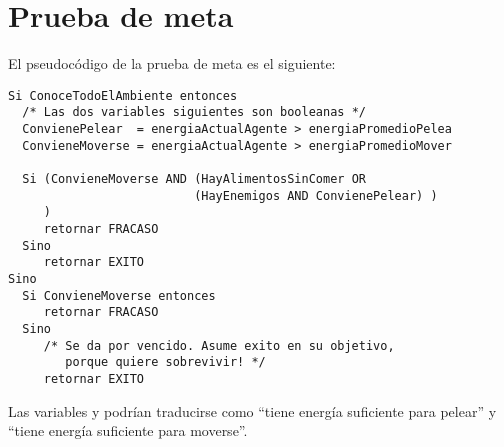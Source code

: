 \section{Prueba de meta}

El pseudocódigo de la prueba de meta es el siguiente:


\begin{verbatim}
Si ConoceTodoElAmbiente entonces
  /* Las dos variables siguientes son booleanas */
  ConvienePelear  = energiaActualAgente > energiaPromedioPelea
  ConvieneMoverse = energiaActualAgente > energiaPromedioMover

  Si (ConvieneMoverse AND (HayAlimentosSinComer OR 
                          (HayEnemigos AND ConvienePelear) )
     )  
     retornar FRACASO
  Sino
     retornar EXITO
Sino
  Si ConvieneMoverse entonces
     retornar FRACASO  
  Sino
     /* Se da por vencido. Asume exito en su objetivo,
        porque quiere sobrevivir! */
     retornar EXITO
\end{verbatim}

Las variables  y  podrían
traducirse como ``tiene energía suficiente para pelear'' y ``tiene energía
suficiente para moverse''.

